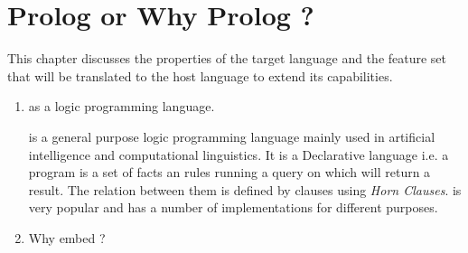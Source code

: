 \documentclass[thesis-solanki.tex]{subfiles}
\begin{document}
\chapter{Prolog or Why Prolog ?}\label{chap:pwp}

This chapter discusses the properties of the target language  and the feature set that will be translated to the host 
language to extend its capabilities.

\begin{enumerate}


\item {} as a logic programming language.

 is a general purpose logic programming language mainly used in artificial intelligence and computational linguistics.  
It is a Declarative language i.e. a program is a set of facts an rules running a query on which will return a result. The relation
between them is defined by clauses using \textit{Horn Clauses}\cite{wikiprolog}.  is very popular and has a number of 
implementations \cite{website:comparisonofprologimplementationswiki} for different purposes. 



\item Why embed  ?


\begin{comment}
http://eliminatingwork.blogspot.ca/2010/02/why-prolog-is-by-far-best-most.html 


First of all I will only advocate the use of pure prolog - that means no recursion, lists, forall's, and any other features. Extra features that were added destroy the whole point of the elegance of prolog.

A prolog equivalent is pervasively used everywhere right under everyone's nose - sql. Pure prolog is almost exactly the same as relational database sql, except that sql has a much worse syntax and requires declaring column names. Column names are a necessary thing for sql's use case (use by many programmers/dba's over the years), but there is no excuse for the sql syntax (attempts were made in the past to get relational databbases to get prolog syntax in the form of datalog but to no avail).

Business rules engines used in many "enterprise" application servers are also shoddy versions of prolog (when they're backward chaining. Forward chaining is inferior to backward chaining, which implies that all these rules engines should be embedded prolog's if the implementors had bothered to study up history).


\end{comment}
\end{enumerate}
\end{document}
